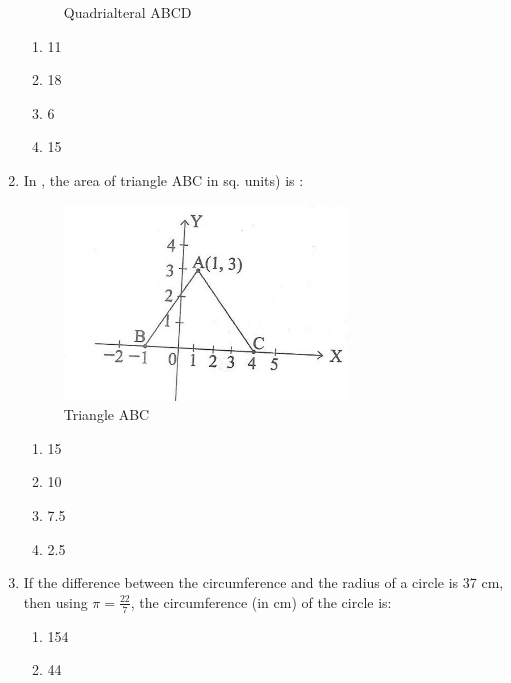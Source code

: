 \begin{enumerate}
\begin{figure}
\caption{Quadrialteral ABCD}
\label{fig:fig2}
		\end{figure}
 \begin{enumerate}
    \item 11\\
    \item 18\\
    \item 6\\
    \item 15
 \end{enumerate}
 \item In , the area of triangle ABC in sq. units) is :
	\begin{figure}[H]
		\centering
\includegraphics[width=\columnwidth]{figs/3.png}
\caption{Triangle ABC}
\label{fig:fig3}
	\end{figure}
 \begin{enumerate}
    \item 15\\
    \item 10\\
    \item 7.5\\
    \item 2.5
 \end{enumerate}
 \item If the difference between the circumference and the radius of a circle is 37 cm, then using $\pi=\frac{22}{7}$, the circumference (in cm) of the circle is:
 \begin{enumerate}
    \item 154\\
    \item 44\\

\end{enumerate}
\end{enumerate}

